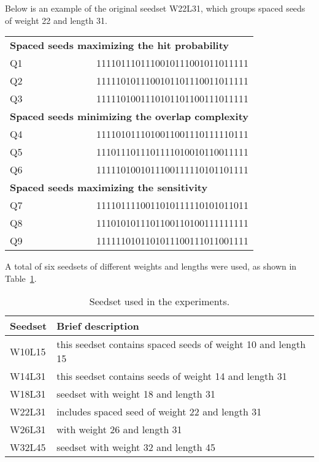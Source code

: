 	
	\begin{example}
		Below is an example of the original seedset W22L31, which groups spaced seeds of weight 22 and length 31.
		\begin{center}
			\begin{tabular}{l r}
				\toprule
				\multicolumn{2}{l}{\bfseries Spaced seeds maximizing the hit probability} \\
				Q1 & 1111011101110010111001011011111 \\
				Q2 & 1111101011100101101110011011111 \\
				Q3 & 1111101001110101101100111011111 \\
				\midrule
				\multicolumn{2}{l}{\bfseries Spaced seeds minimizing the overlap complexity} \\
				Q4 & 1111010111010011001110111110111 \\
				Q5 & 1110111011101111010010110011111 \\
				Q6 & 1111101001011100111110101101111 \\
				\midrule
				\multicolumn{2}{l}{\bfseries Spaced seeds maximizing the sensitivity} \\
				Q7 & 1111011110011010111110101011011 \\
				Q8 & 1110101011101100110100111111111 \\
				Q9 & 1111110101101011100111011001111 \\
				\bottomrule
			\end{tabular}
		\end{center}
	\end{example}
	
	A total of six seedsets of different weights and lengths were used, as shown in Table~\ref{tab:seedset}.
	\begin{table}[!ht]
		\centering
		\begin{tabular}{l l}
			\textbf{Seedset} & \textbf{Brief description} \\
			\toprule
			W10L15 & this seedset contains spaced seeds of weight 10 and length 15 \\
			W14L31 & this seedset contains seeds of weight 14 and length 31 \\
			W18L31 & seedset with weight 18 and length 31 \\
			W22L31 & includes spaced seed of weight 22 and length 31 \\
			W26L31 & with weight 26 and length 31 \\
			W32L45 & seedset with weight 32 and length 45 \\
			\bottomrule
		\end{tabular}
		\caption{Seedset used in the experiments.}
		\label{tab:seedset}
	\end{table}
	
